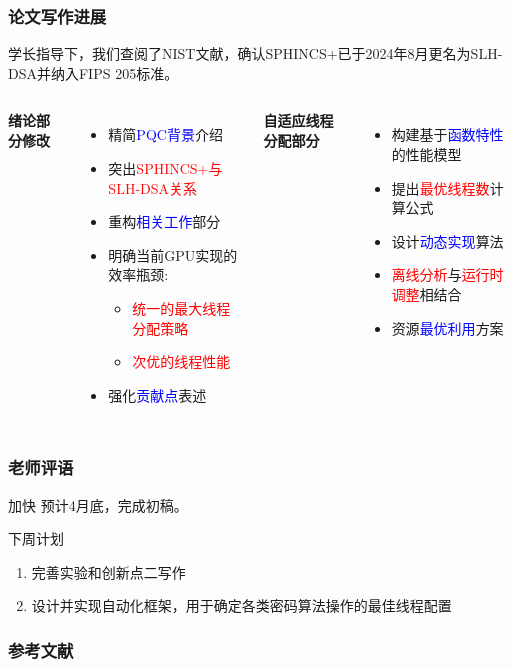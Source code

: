 \documentclass[slide]{../../custom}
\begin{document}
\begin{frame}
  \frametitle{论文写作进展}
  学长指导下，我们查阅了NIST文献，确认SPHINCS+已于2024年8月更名为SLH-DSA并纳入FIPS 205标准。
  \vfill
  \begin{columns}
    \textbf{绪论部分修改}
    \begin{itemize}
      \item 精简\textcolor{blue}{PQC背景}介绍
      \item 突出\textcolor{red}{SPHINCS+与SLH-DSA关系}
      \item 重构\textcolor{blue}{相关工作}部分
      \item 明确当前GPU实现的效率瓶颈:
        \begin{itemize}
          \item \textcolor{red}{统一的最大线程分配策略}
          \item \textcolor{red}{次优的线程性能}
        \end{itemize}
      \item 强化\textcolor{blue}{贡献点}表述
    \end{itemize}

    \textbf{自适应线程分配部分}
    \begin{itemize}
      \item 构建基于\textcolor{blue}{函数特性}的性能模型
      \item 提出\textcolor{red}{最优线程数}计算公式
      \item 设计\textcolor{blue}{动态实现}算法
      \item \textcolor{red}{离线分析}与\textcolor{red}{运行时调整}相结合
      \item 资源\textcolor{blue}{最优利用}方案
    \end{itemize}
  \end{columns}
\end{frame}

\begin{frame}
  \frametitle{老师评语}
  \begin{alertblock}{加快}
  预计4月底，完成初稿。
  \end{alertblock}
  \vfill
  \begin{block}{下周计划}
    \begin{enumerate}
      \item 完善实验和创新点二写作
      \item 设计并实现自动化框架，用于确定各类密码算法操作的最佳线程配置
    \end{enumerate}
  \end{block}


\end{frame}

\begin{frame}
  \frametitle{参考文献}
  
  
\end{frame}
\end{document}

